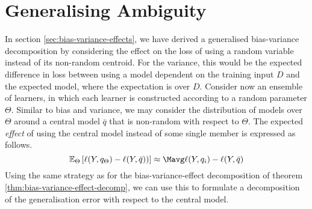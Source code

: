\documentclass[../main.tex]{subfiles}
\begin{document}
\section{Generalising Ambiguity} 



In section \ref{sec:bias-variance-effects}, we have derived a generalised bias-variance decomposition by considering the effect on the loss of using a random variable instead of its non-random centroid. 
For the variance, this would be the expected difference in loss between using a model dependent on the training input $D$ and the expected model, where the expectation is over $D$. 
Consider now an ensemble of learners, in which each learner is constructed according to a random parameter $\Theta$. Similar to bias and variance, we may consider the distribution of models over $\Theta$ around a central model $\bar{q}$ that is non-random with respect to $\Theta$. 
The expected \textit{effect} of using the central model instead of some single member is expressed as follows.
$$
\mathbb{E}_{\Theta}\left[   \ell(Y, q_{\Theta}) -  \ell(Y, \bar{q})) \right] \approx \Mavg \ell(Y, q_i) - \ell(Y, \bar{q})
$$
Using the same strategy as for the bias-variance-effect decomposition of theorem \ref{thm:bias-variance-effect-decomp}, we can use this to formulate a decomposition of the generalisation error with respect to the central model.


\end{document}
